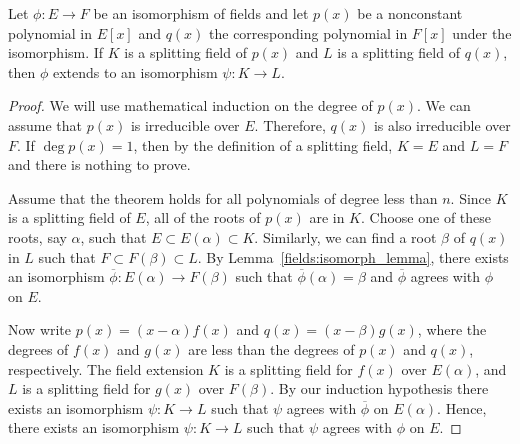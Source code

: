  
\begin{theorem}\label{fields:isomorph_extension_theorem}
Let $\phi : E \rightarrow F$ be an isomorphism of fields and let 
$p(x)$ be a nonconstant polynomial in $E[x]$ and $q(x)$
the corresponding polynomial in $F[x]$ under the isomorphism. If $K$ is
a splitting field of $p(x)$ and $L$ is a splitting field of $q(x)$,
then $\phi$ extends to an isomorphism $\psi : K \rightarrow L$.
\end{theorem}


\begin{proof}
We will use mathematical induction on the degree of $p(x)$. We can
assume that $p(x)$ is irreducible over $E$. Therefore, $q(x)$ is also
irreducible over $F$. If $\deg p(x) = 1$, then by the definition of a
splitting field, $K = E$ and $L = F$ and there is nothing to prove. 


Assume that the theorem holds for all polynomials of degree less than
$n$. Since $K$ is a splitting field of $E$, all of the roots of $p(x)$
are in $K$. Choose one of these roots, say $\alpha$, such that $E
\subset E( \alpha ) \subset K$. Similarly, we can find a root $\beta$
of $q(x)$ in $L$ such that $F \subset F( \beta) \subset L$. 
By Lemma~\ref{fields:isomorph_lemma}, there exists an isomorphism $\overline{\phi} : E(
\alpha ) \rightarrow F( \beta)$ such that $\overline{\phi}( \alpha ) =
\beta$  and $\overline{\phi}$ agrees with $\phi$ on $E$. 

\begin{center}
\end{center}

Now write
$p(x) = (x - \alpha ) f(x)$ and $q(x) = ( x - \beta) g(x)$, where the
degrees of $f(x)$ and $g(x)$ are less than the degrees of $p(x)$ and
$q(x)$, respectively. The field extension $K$ is a splitting field for
$f(x)$ over $E( \alpha)$, and $L$ is a splitting field for $g(x)$
over $F( \beta )$. By our induction hypothesis there exists an
isomorphism  $\psi : K \rightarrow L$ such that $\psi$ agrees with
$\overline{\phi}$ on $E( \alpha)$. Hence, there exists an isomorphism
$\psi : K \rightarrow L$ such that $\psi$ agrees with $\phi$ on $E$. 
\end{proof}


